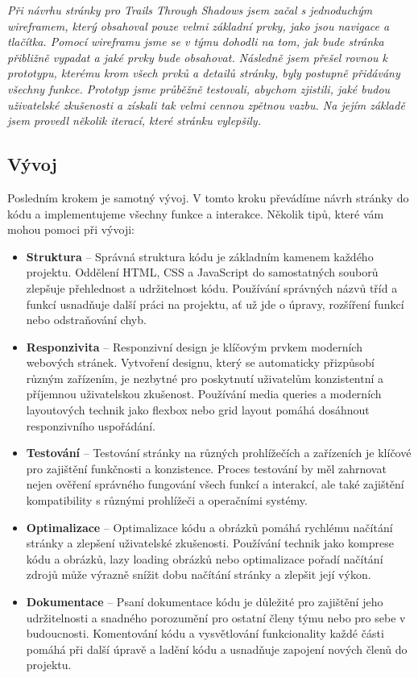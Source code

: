 \textit{Při návrhu stránky pro Trails Through Shadows jsem začal s jednoduchým wireframem, který obsahoval pouze velmi základní prvky, jako jsou navigace a tlačítka. Pomocí wireframu jsme se v týmu dohodli na tom, jak bude stránka přibližně vypadat a jaké prvky bude obsahovat. Následně jsem přešel rovnou k prototypu, kterému krom všech prvků a detailů stránky, byly postupně přidávány všechny funkce. Prototyp jsme průběžně testovali, abychom zjistili, jaké budou uživatelské zkušenosti a získali tak velmi cennou zpětnou vazbu. Na jejím základě jsem provedl několik iterací, které stránku vylepšily.}

\subsection{Vývoj}
\label{subsec:development}

Posledním krokem je samotný vývoj. V tomto kroku převádíme návrh stránky do kódu a implementujeme všechny funkce a interakce. Několik tipů, které vám mohou pomoci při vývoji:

\begin{itemize}
  \item \textbf{Struktura} -- Správná struktura kódu je základním kamenem každého projektu. Oddělení HTML, CSS a JavaScript do samostatných souborů zlepšuje přehlednost a udržitelnost kódu. Používání správných názvů tříd a funkcí usnadňuje další práci na projektu, ať už jde o úpravy, rozšíření funkcí nebo odstraňování chyb.
  \item \textbf{Responzivita} -- Responzivní design je klíčovým prvkem moderních webových stránek. Vytvoření designu, který se automaticky přizpůsobí různým zařízením, je nezbytné pro poskytnutí uživatelům konzistentní a příjemnou uživatelskou zkušenost. Používání media queries a moderních layoutových technik jako flexbox nebo grid layout pomáhá dosáhnout responzivního uspořádání.
  \item \textbf{Testování} -- Testování stránky na různých prohlížečích a zařízeních je klíčové pro zajištění funkčnosti a konzistence. Proces testování by měl zahrnovat nejen ověření správného fungování všech funkcí a interakcí, ale také zajištění kompatibility s různými prohlížeči a operačními systémy.
  \item \textbf{Optimalizace} -- Optimalizace kódu a obrázků pomáhá rychlému načítání stránky a zlepšení uživatelské zkušenosti. Používání technik jako komprese kódu a obrázků, lazy loading obrázků nebo optimalizace pořadí načítání zdrojů může výrazně snížit dobu načítání stránky a zlepšit její výkon.
  \item \textbf{Dokumentace} --  Psaní dokumentace kódu je důležité pro zajištění jeho udržitelnosti a snadného porozumění pro ostatní členy týmu nebo pro sebe v budoucnosti. Komentování kódu a vysvětlování funkcionality každé části pomáhá při další úpravě a ladění kódu a usnadňuje zapojení nových členů do projektu.
\end{itemize}

